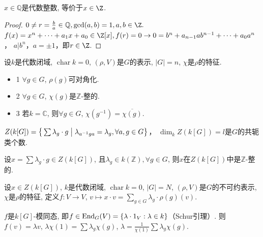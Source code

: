 \begin{proposition}
    $x\in \mathbb{Q}$是代数整数, 等价于$x\in \Z$.
\end{proposition}
\begin{proof}
	$0\neq r=\frac{b}{a}\in \mathbb Q,\gcd(a,b)=1,a,b\in \Z.$
	$f(x)=x^n+\cdots +a_1x+a_0\in \Z[x],f(r)=0
    \rightarrow 0=b^n+a_{n-1}ab^{n-1}+\cdots +a_0a^n$，
    $a|b^n$，$a=\pm 1$，即$r\in \Z$.
\end{proof}


\begin{proposition} 设$k$是代数闭域, $\operatorname{char}k=0$, 
    $(\rho,V)$是$G$的表示, $|G|=n$, $\chi$是$\rho$的特征.
    \begin{itemize}
            \item{1} $\forall g\in G$, $\rho(g)$可对角化.
            \item{2} $\forall g\in G$, $\chi(g)$是$\mathbb{Z}$-整的.
            \item{3} 若$k=\mathbb{C}$, 则$\forall g\in G$, 
            $\chi(g^{-1})=\overline{\chi(g)}$.
    \end{itemize}
\end{proposition}

\qquad $Z(k[G])=\big\{\sum \lambda_g \cdot g\bigm| \lambda_{a^{-1}ga}
=\lambda_g, \forall a, g\in G\big\}$，
$\dim_k Z(k[G])=l$是$G$的共轭类个数.

\begin{proposition}
    设$x=\sum \lambda_g \cdot g \in Z(k[G])$, 
    且$\lambda_g\in k(\mathbb{Z}), \forall g\in G$, 
    则$x$在$Z(k[G])$中是$\mathbb{Z}$-整的.
\end{proposition}

\begin{definition}
    设$x\in Z(k[G])$, $k$是代数闭域, $\operatorname{char} k=0$, 
    $|G|=N$, $(\rho,V)$是$G$的不可约表示, $\chi$是$\rho$的特征, 
    定义$f:V\rightarrow V$, $v\mapsto x\cdot v
    =\sum\limits_{g\in G} \lambda_g\cdot \rho(g)(v)$.
\end{definition}

\begin{proposition}
    $f$是$k[G]$-模同态, 即$f\in \operatorname{End}_G(V)
    =\{\lambda\cdot 1_V:\lambda\in k\}$（Schur引理）. 
    则$f(v)=\lambda v$, $\lambda\chi(1)=\sum \lambda_g\chi(g)$, 
    $\lambda=\frac{1}{\chi(1)}\sum \lambda_g\chi(g)$.
\end{proposition}

